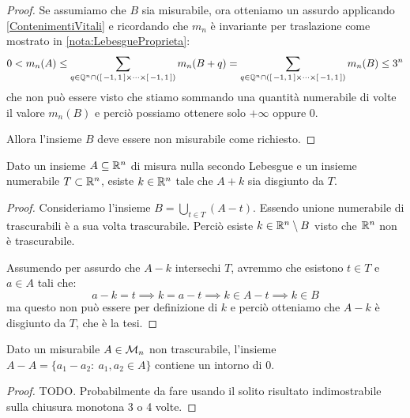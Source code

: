 \begin{proof}
	Se assumiamo che $B$ sia misurabile, ora otteniamo un assurdo applicando \cref{ContenimentiVitali} e ricordando che $m_n$ è invariante per traslazione come mostrato in \cref{nota:LebesgueProprieta}:
	\begin{equation*}
		0<m_n(A)\le \sum_{q\in \mathbb Q^n\cap\left(\left[\,-1,\,1\,\right]\times\cdots \times\left[\,-1,\,1\,\right]\right)} m_n(B+q)=
		\sum_{q\in \mathbb Q^n\cap\left(\left[\,-1,\,1\,\right]\times\cdots \times\left[\,-1,\,1\,\right]\right)} m_n(B) \le 3^n
	\end{equation*}
	che non può essere visto che stiamo sommando una quantità numerabile di volte il valore $m_n(B)$ e perciò possiamo ottenere solo $+\infty$ oppure $0$.
	
	Allora l'insieme $B$ deve essere non misurabile come richiesto.
\end{proof}

\begin{exercise}
	Dato un insieme $A\subseteq\mathbb R^n$ di misura nulla secondo Lebesgue e un insieme numerabile $T\subset \mathbb R^n$, esiste $k\in \mathbb R^n$ tale che $A+k$ sia disgiunto da $T$.
\end{exercise}
\begin{proof}
	Consideriamo l'insieme $B=\bigcup_{t\in T} (A-t)$. 
	Essendo unione numerabile di trascurabili è a sua volta trascurabile.
	Perciò esiste $k\in\mathbb R^n\setminus B$ visto che $\mathbb R^n$ non è trascurabile.
	
	Assumendo per assurdo che $A-k$ intersechi $T$, avremmo che esistono $t\in T$ e $a\in A$ tali che:
	\begin{equation*}
		a-k=t\implies k=a-t \implies k\in A-t\implies k\in B	
	\end{equation*}
	ma questo non può essere per definizione di $k$ e perciò otteniamo che $A-k$ è disgiunto da $T$, che è la tesi.
\end{proof}

\begin{theorem}[Steinhaus]\label{thm:Steinhaus}%
	Dato un misurabile $A\in\mathcal M_n$ non trascurabile, l'insieme $A-A=\{a_1-a_2:\ a_1,a_2\in A\}$ contiene un intorno di $0$.
\end{theorem}
\begin{proof}
	TODO.
	Probabilmente da fare usando il solito risultato indimostrabile sulla chiusura monotona 3 o 4 volte.
\end{proof}


